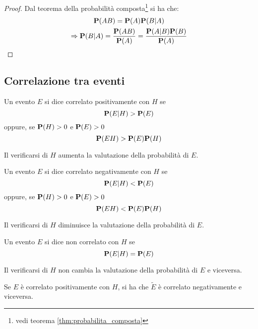 \begin{proof}
  Dal teorema della probabilità composta\footnote{vedi teorema \ref{thm:probabilita_composta}} si ha che:
  \begin{gather*}
    \mathbf{P}(AB) = \mathbf{P}(A)\mathbf{P}(B|A) \\
    \Rightarrow \mathbf{P}(B|A) = \frac{\mathbf{P}(AB)}{\mathbf{P}(A)} = \frac{\mathbf{P}(A|B)\mathbf{P}(B)}{\mathbf{P}(A)}
  \end{gather*}
\end{proof}


\subsection{Correlazione tra eventi} %
\begin{definition}
  \label{def:eventi_correlati_positivamente}
  Un evento $E$ si dice correlato positivamente con $H$ se
  \[ \mathbf{P}(E|H) > \mathbf{P}(E) \]
  oppure, se \( \mathbf{P}(H) > 0 \) e \( \mathbf{P}(E) > 0 \)
  \[ \mathbf{P}(EH) > \mathbf{P}(E)\mathbf{P}(H) \]

  Il verificarsi di $H$ aumenta la valutazione della probabilità di $E$.
\end{definition}

\begin{definition}
  \label{def:eventi_correlati_negativamente}
  Un evento $E$ si dice correlato negativamente con $H$ se
  \[ \mathbf{P}(E|H) < \mathbf{P}(E) \]
  oppure, se \( \mathbf{P}(H) > 0 \) e \( \mathbf{P}(E) > 0 \)
  \[ \mathbf{P}(EH) < \mathbf{P}(E)\mathbf{P}(H) \]

  Il verificarsi di $H$ diminuisce la valutazione della probabilità di $E$.
\end{definition}

\begin{definition}
  \label{def:eventi_non_correlati}
  Un evento $E$ si dice non correlato con $H$ se
  \[ \mathbf{P}(E|H) = \mathbf{P}(E) \]

  Il verificarsi di $H$ non cambia la valutazione della probabilità di $E$ e viceversa.
\end{definition}

Se $E$ è correlato positivamente con $H$, si ha che \( \tilde{E} \) è correlato negativamente e viceversa. %


